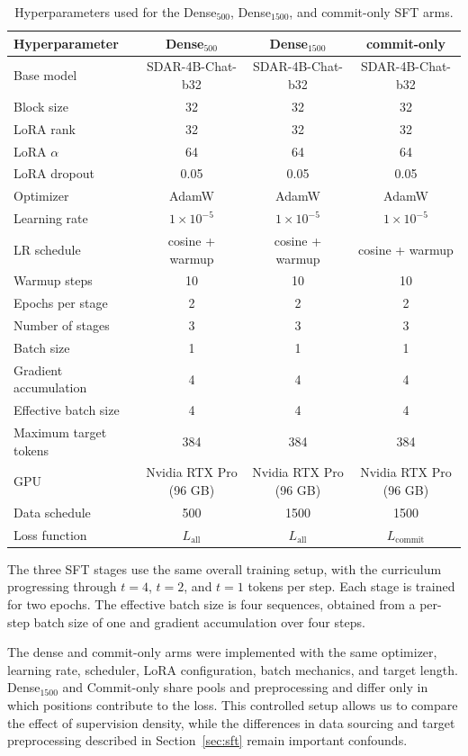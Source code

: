 \documentclass{article}
\begin{document}
\begin{table}[H]
  \caption{Hyperparameters used for the Dense$_{500}$, Dense$_{1500}$, and commit-only SFT arms.}
  \label{tab:sft_hyperparameters}
  \centering
  \small
  \begin{tabular}{lccc}
    \toprule
    Hyperparameter & Dense$_{500}$ & Dense$_{1500}$ & commit-only \\
    \midrule
    Base model & SDAR-4B-Chat-b32 & SDAR-4B-Chat-b32 & SDAR-4B-Chat-b32 \\
    Block size & 32 & 32 & 32 \\
    LoRA rank & 32 & 32 & 32 \\
    LoRA $\alpha$ & 64 & 64 & 64 \\
    LoRA dropout & 0.05 & 0.05 & 0.05 \\
    Optimizer & AdamW & AdamW & AdamW \\
    Learning rate & $1\times10^{-5}$ & $1\times10^{-5}$ & $1\times10^{-5}$ \\
    LR schedule & cosine + warmup & cosine + warmup & cosine + warmup \\
    Warmup steps & 10 & 10 & 10 \\
    Epochs per stage & 2 & 2 & 2 \\
    Number of stages & 3 & 3 & 3 \\
    Batch size & 1 & 1 & 1 \\
    Gradient accumulation & 4 & 4 & 4 \\
    Effective batch size & 4 & 4 & 4 \\
    Maximum target tokens & 384 & 384 & 384 \\
    GPU & Nvidia RTX Pro (96 GB) & Nvidia RTX Pro (96 GB) & Nvidia RTX Pro (96 GB) \\
    Data schedule & 500 & 1500 & 1500 \\
    Loss function & $L_{\text{all}}$ & $L_{\text{all}}$ & $L_{\text{commit}}$ \\
    \bottomrule
  \end{tabular}
\end{table}

The three SFT stages use the same overall training setup, with the
curriculum progressing through $t=4$, $t=2$, and $t=1$ tokens per step.
Each stage is trained for two epochs. The effective batch size is four
sequences, obtained from a per-step batch size of one and gradient
accumulation over four steps.

The dense and commit-only arms were implemented with the same optimizer,
learning rate, scheduler, LoRA configuration, batch mechanics, and target
length. Dense$_{1500}$ and Commit-only share pools and preprocessing and differ only in which positions contribute to the loss. This controlled setup allows us to compare the effect of supervision
density, while the differences in data sourcing and target preprocessing
described in Section~\ref{sec:sft} remain important confounds.
\end{document}
